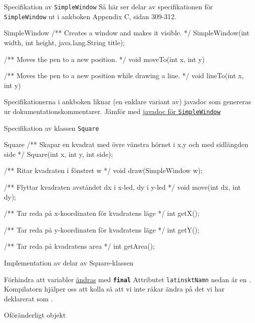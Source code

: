\documentclass{lecturenotes}
\begin{document}
\begin{Slide}{Specifikation av \texttt{SimpleWindow}}
Så här ser delar av specifikationen för \texttt{SimpleWindow} ut i ankboken Appendix C, sidan 309-312.
\begin{ClassSpec}{SimpleWindow}
/** Creates a window and makes it visible. */
SimpleWindow(int width, int height, java.lang.String title);

/** Moves the pen to a new position. */
void moveTo(int x, int y)

/** Moves the pen to a new position while drawing a line. */
void lineTo(int x, int y)
\end{ClassSpec}
Specifikationerna i ankboken liknar (en enklare variant av) javadoc som genereras ur dokumentationskommentarer. Jämför med \href{http://fileadmin.cs.lth.se/cs/Education/EDA016/2015/doc/se/lth/cs/pt/window/SimpleWindow.html}{javadoc för \texttt{SimpleWindow}}
\end{Slide}


\begin{Slide}{Specifikation av klassen \texttt{Square}}
\begin{ClassSpec}{Square}
/** Skapar en kvadrat med övre vänstra hörnet i x,y och med sidlängden side  */
Square(int x, int y, int side);

/** Ritar kvadraten i fönstret w */
void draw(SimpleWindow w);

/** Flyttar kvadraten avståndet dx i x-led, dy i y-led */
void move(int dx, int dy);

/** Tar reda på x-koordinaten för kvadratens läge */
int getX();

/** Tar reda på y-koordinaten för kvadratens läge */
int getY();

/** Tar reda på kvadratens area */
int getArea();
\end{ClassSpec}
\end{Slide}

\begin{Slide}{Implementation av delar av Square-klassen}

\end{Slide}



\begin{Slide}{Förhindra att variabler \href{https://docs.oracle.com/javase/tutorial/essential/concurrency/immutable.html}{ändras} med \texttt{\textbf{final}}}
Attributet \texttt{latinsktNamn} nedan är en .\\ Kompilatorn hjälper oss att kolla så att vi inte råkar ändra på det vi har deklarerat som .

\end{Slide}

\begin{Slide}{Oföränderligt objekt}

\end{Slide}
\end{document}
